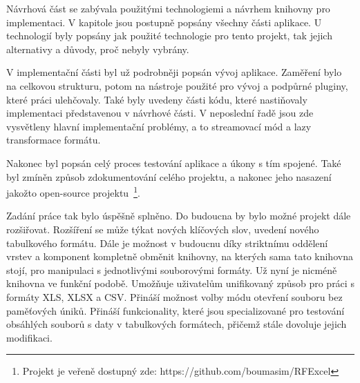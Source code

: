 Návrhová část se zabývala použitými technologiemi a návrhem knihovny pro implementaci. V kapitole jsou postupně popsány všechny části aplikace. U technologií byly popsány jak použité technologie pro tento projekt, tak jejich alternativy a důvody, proč nebyly vybrány.

V implementační části byl už podrobněji popsán vývoj aplikace. Zaměření bylo na celkovou strukturu, potom na nástroje použité pro vývoj a podpůrné pluginy, které práci ulehčovaly. Také byly uvedeny části kódu, které nastiňovaly implementaci představenou v návrhové části. V neposlední řadě jsou zde vysvětleny hlavní implementační problémy, a to streamovací mód a lazy transformace formátu.

Nakonec byl popsán celý proces testování aplikace a úkony s tím spojené. Také byl zmíněn způsob zdokumentování celého projektu, a nakonec jeho nasazení jakožto open-source projektu~\footnote{Projekt je veřeně dostupný zde: https://github.com/boumasim/RFExcel}.

Zadání práce tak bylo úspěšně splněno. Do budoucna by bylo možné projekt dále rozšiřovat. Rozšíření se může týkat nových klíčových slov, uvedení nového tabulkového formátu. Dále je možnost v budoucnu díky striktnímu oddělení vrstev a komponent kompletně obměnit knihovny, na kterých sama tato knihovna stojí, pro manipulaci s jednotlivými souborovými formáty. Už nyní je nicméně knihovna ve funkční podobě. Umožňuje uživatelům unifikovaný způsob pro práci s formáty XLS, XLSX a CSV. Přináší možnost volby módu otevření souboru bez paměťových úniků. Přináší funkcionality, které jsou specializované pro testování obsáhlých souborů s daty v tabulkových formátech, přičemž stále dovoluje jejich modifikaci.